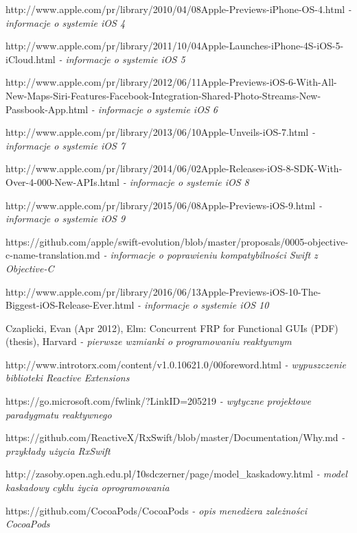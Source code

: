\documentclass[12pt,oneside,a4paper]{report}
\begin{document}
\begin{thebibliography}{50}
http://www.apple.com/pr/library/2010/04/08Apple-Previews-iPhone-OS-4.html
\emph{ - informacje o systemie iOS 4}

http://www.apple.com/pr/library/2011/10/04Apple-Launches-iPhone-4S-iOS-5-iCloud.html
\emph{ - informacje o systemie iOS 5}

http://www.apple.com/pr/library/2012/06/11Apple-Previews-iOS-6-With-All-New-Maps-Siri-Features-Facebook-Integration-Shared-Photo-Streams-New-Passbook-App.html
\emph{ - informacje o systemie iOS 6}

http://www.apple.com/pr/library/2013/06/10Apple-Unveils-iOS-7.html
\emph{ - informacje o systemie iOS 7}

http://www.apple.com/pr/library/2014/06/02Apple-Releases-iOS-8-SDK-With-Over-4-000-New-APIs.html
\emph{ - informacje o systemie iOS 8}

http://www.apple.com/pr/library/2015/06/08Apple-Previews-iOS-9.html
\emph{ - informacje o systemie iOS 9}

https://github.com/apple/swift-evolution/blob/master/proposals/0005-objective-c-name-translation.md
\emph{ - informacje o poprawieniu kompatybilności Swift z Objective-C}

http://www.apple.com/pr/library/2016/06/13Apple-Previews-iOS-10-The-Biggest-iOS-Release-Ever.html
\emph{ - informacje o systemie iOS 10}

 Czaplicki, Evan (Apr 2012), Elm: Concurrent FRP for Functional GUIs (PDF) (thesis), Harvard
\emph{ - pierwsze wzmianki o programowaniu reaktywnym}

 http://www.introtorx.com/content/v1.0.10621.0/00foreword.html
\emph{ - wypuszczenie biblioteki Reactive Extensions}

 https://go.microsoft.com/fwlink/?LinkID=205219
\emph{ - wytyczne projektowe paradygmatu reaktywnego}

https://github.com/ReactiveX/RxSwift/blob/master/Documentation/Why.md
\emph{ - przykłady użycia RxSwift}

 http://zasoby.open.agh.edu.pl/\~10sdczerner/page/model\_kaskadowy.html
\emph{ - model kaskadowy cyklu życia oprogramowania}

 https://github.com/CocoaPods/CocoaPods
\emph{ - opis menedżera zależności CocoaPods}


\end{thebibliography}
\end{document}
